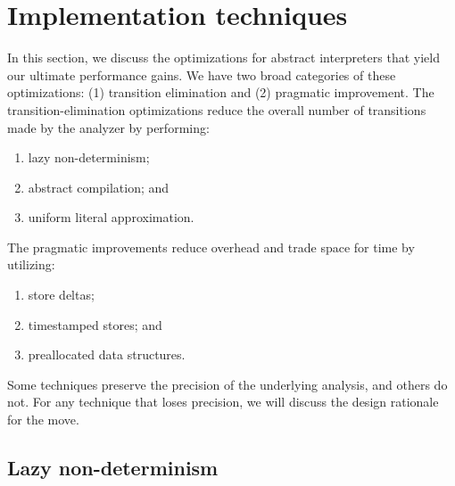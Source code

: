 \documentclass[preprint,onecolumn,9pt]{sigplanconf} %
\begin{document}


\section{Implementation techniques}
\label{sec:opt}

In this section, we discuss the optimizations for abstract interpreters that
yield our ultimate performance gains.
%
We have two broad categories of these optimizations: (1) transition elimination
and (2) pragmatic improvement.
%
The transition-elimination optimizations reduce the overall number of transitions
made by the analyzer by performing:
\begin{enumerate}
 \item lazy non-determinism;
 \item abstract compilation; and
 \item uniform literal approximation.
\end{enumerate}
The pragmatic improvements reduce overhead and trade space for time
by utilizing:
\begin{enumerate}
 \item store deltas;
 \item timestamped stores; and
 \item preallocated data structures.
\end{enumerate}

Some techniques preserve the precision of the underlying analysis, and others
do not.
%
For any technique that loses precision, we will discuss the design rationale
for the move.


\subsection{Lazy non-determinism}
\end{document}

